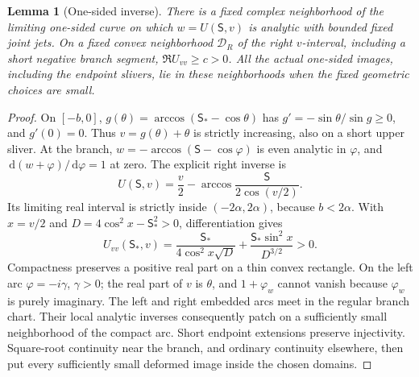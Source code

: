 \documentclass[11pt]{article}
\numberwithin{equation}{section}
\newtheorem{lemma}[theorem]{Lemma}
\theoremstyle{definition}
\newcommand{\dd}{\,\mathrm d}
\begin{document}
\begin{lemma}[One-sided inverse]\label{lem:iso-inverse}
There is a fixed complex neighborhood of the limiting one-sided
curve on which $w=U(\mathsf S,v)$ is analytic with bounded fixed
joint jets.  On a fixed convex neighborhood $\mathcal D_R$ of the
right $v$-interval, including a short negative branch segment,
$\Re U_{vv}\ge c>0$.  All the actual one-sided images, including
the endpoint slivers, lie in these neighborhoods when the fixed
geometric choices are small.
\end{lemma}
\begin{proof}
On $[-b,0]$, $g(\theta)=\arccos(\mathsf S_*-\cos\theta)$ has
$g'=-\sin\theta/\sin g\ge0$, and $g'(0)=0$.
Thus $v=g(\theta)+\theta$ is strictly increasing, also on a short
upper sliver.  At the branch,
$w=-\arccos(\mathsf S-\cos\varphi)$ is even analytic in
$\varphi$, and $\dd(w+\varphi)/\dd\varphi=1$ at zero.
The explicit right inverse is
\begin{equation}\label{eq:iso-inverse-explicit}
 U(\mathsf S,v)=\frac v2-
       \arccos\frac{\mathsf S}{2\cos(v/2)}.
\end{equation}
Its limiting real interval is strictly inside $(-2\alpha,2\alpha)$,
because $b<2\alpha$.  With $x=v/2$ and
$D=4\cos^2x-\mathsf S_*^2>0$, differentiation gives
\[
 U_{vv}(\mathsf S_*,v)
 =\frac{\mathsf S_*}{4\cos^2x\sqrt D}
      +\frac{\mathsf S_*\sin^2x}{D^{3/2}}>0.
\]
Compactness preserves a positive real part on a thin convex rectangle.
On the left arc $\varphi=-i\gamma$, $\gamma>0$; the real part of $v$
is $\theta$, and $1+\varphi_w$ cannot vanish because $\varphi_w$
is purely imaginary.  The left and right embedded arcs meet in the
regular branch chart.  Their local analytic inverses consequently
patch on a sufficiently small neighborhood of the compact arc.
Short endpoint extensions preserve injectivity.  Square-root
continuity near the branch, and ordinary continuity elsewhere, then
put every sufficiently small deformed image inside the chosen domains.
\end{proof}
\end{document}

